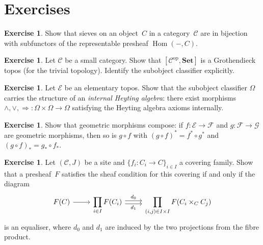 \documentclass[a4paper,12pt]{book}
\DeclareMathOperator{\Hom}{Hom}
\newcommand{\Set}{\mathbf{Set}}
\newcommand{\op}{\mathrm{op}}
\theoremstyle{definition}
\newtheorem{exercise}[definition]{Exercise}
\theoremstyle{plain}
\theoremstyle{remark}
\begin{document}


\section{Exercises}\label{sec:topos-exercises}

\begin{exercise}\label{ex:sieves-subfunctors}
Show that sieves on an object~$C$ in a category~$\mathcal{C}$ are in
bijection with subfunctors of the representable presheaf $\Hom(-,C)$.
\end{exercise}

\begin{exercise}\label{ex:presheaf-topos}
Let $\mathcal{C}$ be a small category.  Show that $[\mathcal{C}^{\op}, \Set]$
is a Grothendieck topos (for the trivial topology).
Identify the subobject classifier explicitly.
\end{exercise}

\begin{exercise}\label{ex:omega-internal-heyting}
Let $\mathcal{E}$ be an elementary topos.  Show that the subobject
classifier $\Omega$ carries the structure of an \emph{internal Heyting
algebra}: there exist morphisms
$\wedge, \vee, \Rightarrow\colon\Omega\times\Omega\to\Omega$
satisfying the Heyting algebra axioms internally.
\end{exercise}

\begin{exercise}\label{ex:geometric-morphism-compose}
Show that geometric morphisms compose: if
$f\colon\mathcal{E}\to\mathcal{F}$ and $g\colon\mathcal{F}\to\mathcal{G}$
are geometric morphisms, then so is $g\circ f$ with
$(g\circ f)^* = f^*\circ g^*$ and $(g\circ f)_* = g_*\circ f_*$.
\end{exercise}

\begin{exercise}\label{ex:sheaf-condition-equaliser}
Let $(\mathcal{C},J)$ be a site and $\{f_i\colon C_i\to C\}_{i\in I}$
a covering family.  Show that a presheaf~$F$ satisfies the sheaf condition
for this covering if and only if the diagram
\[
\begin{tikzcd}
F(C) \arrow[r] &
\displaystyle\prod_{i\in I} F(C_i)
  \arrow[r, shift left=0.5ex, "d_0"]
  \arrow[r, shift right=0.5ex, "d_1"'] &
\displaystyle\prod_{(i,j)\in I\times I} F(C_i\times_C C_j)
\end{tikzcd}
\]
is an equaliser, where $d_0$ and $d_1$ are induced by the two projections
from the fibre product.
\end{exercise}
\end{document}
